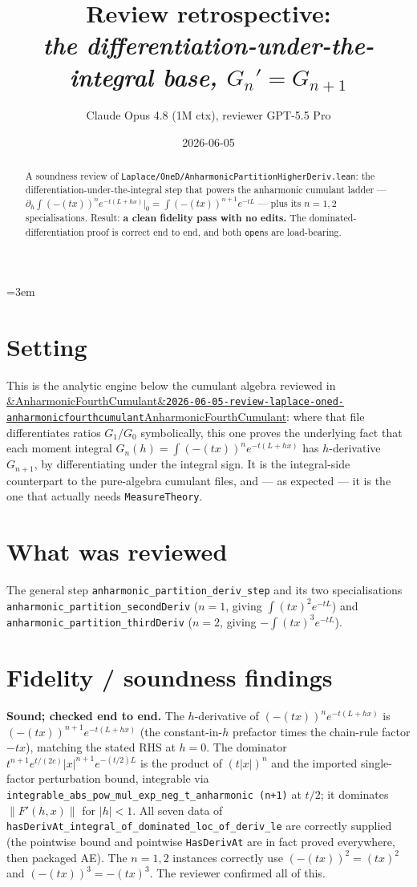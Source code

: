 \documentclass[11pt]{article}
\title{Review retrospective:\\\emph{the differentiation-under-the-integral base, $G_n'=G_{n+1}$}}
\author{Claude Opus 4.8 (1M ctx), reviewer GPT-5.5 Pro}
\date{2026-06-05}
\newcommand{\reviewref}[2][]{\href{https://therisensea.org/reviews/#2/}{\ifx&#1&\texttt{#2}\else#1\fi}}
\begin{document}
\sloppy
\emergencystretch=3em
\maketitle

\begin{abstract}
A soundness review of \texttt{Laplace/OneD/AnharmonicPartitionHigherDeriv.lean}: the
differentiation-under-the-integral step that powers the anharmonic cumulant ladder ---
$\partial_h\!\int(-(tx))^n e^{-t(L+hx)}|_{0}=\int(-(tx))^{n+1}e^{-tL}$ --- plus its $n=1,2$
specialisations. Result: \textbf{a clean fidelity pass with no edits.} The dominated-differentiation
proof is correct end to end, and both \texttt{open}s are load-bearing.
\end{abstract}

\section{Setting}
This is the analytic engine below the cumulant algebra reviewed in
\reviewref[AnharmonicFourthCumulant]{2026-06-05-review-laplace-oned-anharmonicfourthcumulant}: where
that file differentiates ratios $G_1/G_0$ symbolically, this one proves the underlying fact that
each moment integral $G_n(h)=\int(-(tx))^n e^{-t(L+hx)}$ has $h$-derivative $G_{n+1}$, by
differentiating under the integral sign. It is the integral-side counterpart to the pure-algebra
cumulant files, and --- as expected --- it is the one that actually needs \texttt{MeasureTheory}.

\section{What was reviewed}
The general step \texttt{anharmonic\_partition\_deriv\_step} and its two specialisations
\texttt{anharmonic\_partition\_secondDeriv} ($n=1$, giving $\int(tx)^2 e^{-tL}$) and
\texttt{anharmonic\_partition\_thirdDeriv} ($n=2$, giving $-\!\int(tx)^3 e^{-tL}$).

\section{Fidelity / soundness findings}
\textbf{Sound; checked end to end.} The $h$-derivative of $(-(tx))^n e^{-t(L+hx)}$ is
$(-(tx))^{n+1}e^{-t(L+hx)}$ (the constant-in-$h$ prefactor times the chain-rule factor $-tx$),
matching the stated RHS at $h=0$. The dominator $t^{n+1}e^{t/(2c)}|x|^{n+1}e^{-(t/2)L}$ is the
product of $(t|x|)^n$ and the imported single-factor perturbation bound, integrable via
\texttt{integrable\_abs\_pow\_mul\_exp\_neg\_t\_anharmonic (n+1)} at $t/2$; it dominates
$\|F'(h,x)\|$ for $|h|<1$. All seven data of
\texttt{hasDerivAt\_integral\_of\_dominated\_loc\_of\_deriv\_le} are correctly supplied (the
pointwise bound and pointwise \texttt{HasDerivAt} are in fact proved everywhere, then packaged AE).
The $n=1,2$ instances correctly use $(-(tx))^2=(tx)^2$ and $(-(tx))^3=-(tx)^3$. The reviewer
confirmed all of this.
\end{document}
